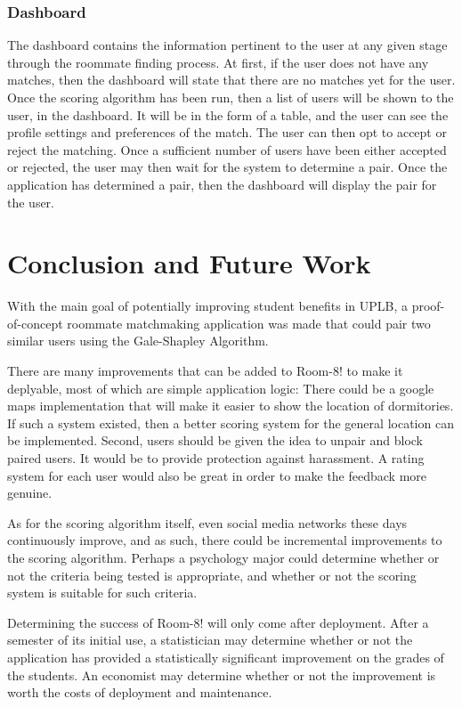 \documentclass[journal]{IEEEtran}
\begin{document}
        \subsubsection{Dashboard}
        The dashboard contains the information pertinent to the user at any given stage through the roommate finding
        process. At first, if the user does not have any matches, then the dashboard will state that there are no
        matches yet for the user. Once the scoring algorithm has been run, then a list of users will be shown to the
        user, in the dashboard. It will be in the form of a table, and the user can see the profile settings and
        preferences of the match. The user can then opt to accept or reject the matching. Once a sufficient number of
        users have been either accepted or rejected, the user may then wait for the system to determine a pair. Once the
        application has determined a pair, then the dashboard will display the pair for the user.

\section{Conclusion and Future Work}
With the main goal of potentially improving student benefits in UPLB, a proof-of-concept roommate matchmaking
application was made that could pair two similar users using the Gale-Shapley Algorithm. 

There are many improvements that can be added to Room-8! to make it deplyable, most of which are simple application
logic: There could be a google maps implementation that will make it easier to show the location of dormitories. If such
a system existed, then a better scoring system for the general location can be implemented. Second, users should be
given the idea to unpair and block paired users. It would be to provide protection against harassment. A rating system
for each user would also be great in order to make the feedback more genuine.

As for the scoring algorithm itself, even social media networks these days continuously improve, and as such, there
could be incremental improvements to the scoring algorithm. Perhaps a psychology major could determine whether or not
the criteria being tested is appropriate, and whether or not the scoring system is suitable for such criteria.

Determining the success of Room-8! will only come after deployment. After a semester of its initial use, a statistician
may determine whether or not the application has provided a statistically significant improvement on the grades of the
students. An economist may determine whether or not the improvement is worth the costs of deployment and maintenance.
\end{document}
